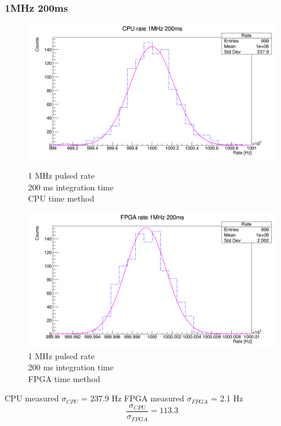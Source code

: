 \subsubsection{1MHz 200ms}
\begin{figure}[H]
	\centering
	\begin{minipage}{0.49\textwidth}
		\centering
		\includegraphics[width=.99\linewidth]{IMG/ch5/RateMeasures/CPU-time-rate-1MHz-200ms}
		\caption{1 MHz pulsed rate\\200 ms integration time\\CPU time method}
		\label{fig:CPU-time-rate-1MHz-200ms}
	\end{minipage}%
	\begin{minipage}{0.49\textwidth}
		\centering
		\includegraphics[width=.99\linewidth]{IMG/ch5/RateMeasures/FPGA-time-rate-1MHz-200ms}
		\caption{1 MHz pulsed rate\\200 ms integration time\\FPGA time method}
		\label{fig:FPGA-time-rate-1MHz-200ms}
	\end{minipage}
\end{figure}
\noindent CPU measured $\sigma_{CPU}$ = 237.9 Hz
\newline
FPGA measured $\sigma_{FPGA}$ = 2.1 Hz
\begin{equation}
	\frac{\sigma_{CPU}}{\sigma_{FPGA}} = 113.3
\end{equation}

